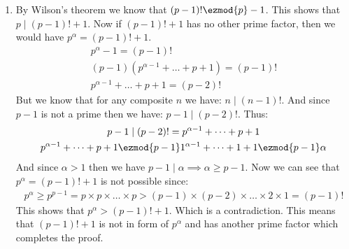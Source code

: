 \begin{enumerate}[label=]
    \item 
        By Wilson's theorem we know that $(p - 1)! \ezmod{p} -1$. This shows that $p \mid (p - 1)! + 1$.
        Now if $(p - 1)! + 1$ has no other prime factor, then we would have $p^\alpha = (p - 1)! + 1$.
        \begin{gather*}
            p^\alpha - 1 = (p - 1)! \\
            (p - 1)(p^{\alpha - 1} + \dots + p + 1) = (p - 1)! \\
            p^{\alpha - 1} + \dots + p + 1 = (p - 2)!
        \end{gather*}
        But we know that for any composite $n$ we have: $n \mid (n - 1)!$. And since $p - 1$ is not a prime then we have: $p - 1 \mid (p - 2)!$. Thus:
        \begin{gather*}
            p - 1 \mid (p - 2)! = p^{\alpha - 1} + \dots + p + 1 \\
            p^{\alpha - 1} + \dots + p + 1 \ezmod{p - 1} 1^{\alpha - 1} + \dots + 1 + 1 \ezmod{p-1} \alpha
        \end{gather*}
        And since $\alpha > 1$ then we have $p - 1 \mid \alpha \implies \alpha \ge p - 1$. Now we can see that $p^\alpha = (p - 1)! + 1$ is not possible since:
        \begin{gather*}
            p^\alpha \ge p^{p - 1} = p \times p \times \dots \times p > (p - 1) \times (p - 2) \times \dots \times 2 \times 1 = (p - 1)!
        \end{gather*}
        This shows that $p^\alpha > (p - 1)! + 1$. Which is a contradiction. This means that $(p - 1)! + 1$ is not in form of $p^\alpha$ and has another prime factor which completes the proof.
\end{enumerate}